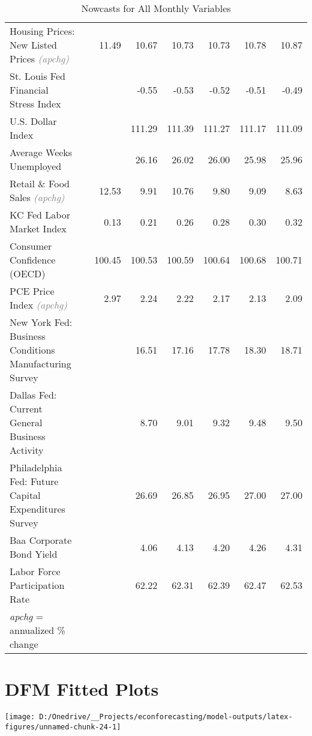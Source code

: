 \documentclass[11pt, letterpaper]{article}\usepackage[]{graphicx}\usepackage[]{color}
\begin{document}
\begin{table}[H]
\begin{tabular}{lrrrrrrr}
  Housing Prices: New Listed Prices \textit{\footnotesize\textcolor{gray}{(apchg)}} &  & 11.49 & 10.67 & 10.73 & 10.73 & 10.78 & 10.87 \\ 
  St. Louis Fed Financial Stress Index &  &  & -0.55 & -0.53 & -0.52 & -0.51 & -0.49 \\ 
  U.S. Dollar Index &  &  & 111.29 & 111.39 & 111.27 & 111.17 & 111.09 \\ 
  Average Weeks Unemployed &  &  & 26.16 & 26.02 & 26.00 & 25.98 & 25.96 \\ 
  Retail \& Food Sales \textit{\footnotesize\textcolor{gray}{(apchg)}} &  & 12.53 & 9.91 & 10.76 & 9.80 & 9.09 & 8.63 \\ 
  KC Fed Labor Market Index &  & 0.13 & 0.21 & 0.26 & 0.28 & 0.30 & 0.32 \\ 
  Consumer Confidence (OECD) &  & 100.45 & 100.53 & 100.59 & 100.64 & 100.68 & 100.71 \\ 
  PCE Price Index \textit{\footnotesize\textcolor{gray}{(apchg)}} &  & 2.97 & 2.24 & 2.22 & 2.17 & 2.13 & 2.09 \\ 
  New York Fed: Business Conditions Manufacturing Survey &  &  & 16.51 & 17.16 & 17.78 & 18.30 & 18.71 \\ 
  Dallas Fed: Current General Business Activity &  &  & 8.70 & 9.01 & 9.32 & 9.48 & 9.50 \\ 
  Philadelphia Fed: Future Capital Expenditures Survey &  &  & 26.69 & 26.85 & 26.95 & 27.00 & 27.00 \\ 
  Baa Corporate Bond Yield &  &  & 4.06 & 4.13 & 4.20 & 4.26 & 4.31 \\ 
  Labor Force Participation Rate &  &  & 62.22 & 62.31 & 62.39 & 62.47 & 62.53 \\ 
   \hline 
 \textit{apchg} = annualized \% change 
\end{tabular}
\endgroup
\caption{Nowcasts for All Monthly Variables} 
\end{table}



\appendix
\appendixpage
\addappheadtotoc

\section{DFM Fitted Plots}


{\centering \texttt{[image: D:/Onedrive/\_\_Projects/econforecasting/model-outputs/latex-figures/unnamed-chunk-24-1]} 

}
\end{document}
